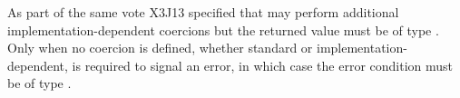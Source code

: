\begin{defun}[Функция]
\begin{newer}
As part of the same vote X3J13 specified that 
may perform additional implementation-dependent coercions
but the returned value must be of type .
Only when no coercion is defined, whether standard or implementation-dependent,
is  required to signal an error, in which case the error condition
must be of type .
\end{newer}
\end{defun}

\fi